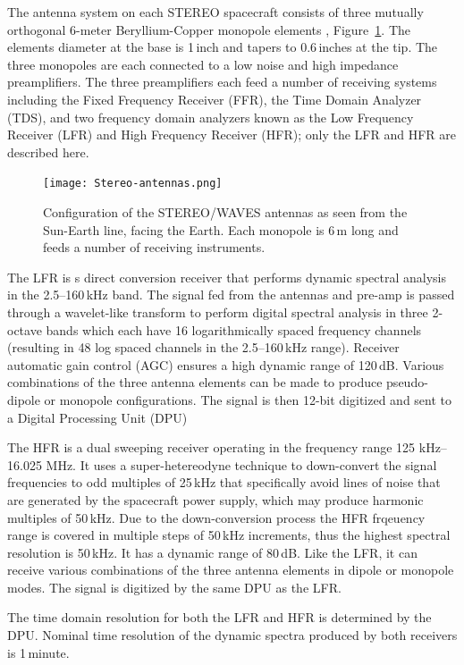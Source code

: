 The antenna system on each STEREO spacecraft consists of three mutually orthogonal 6-meter Beryllium-Copper monopole elements \citep{bale2008}, Figure~\ref{fig:swaves_antennas}. The elements diameter at the base is 1\,inch and tapers to 0.6\,inches at the tip. The three monopoles are each connected to a low noise and high impedance preamplifiers. The three preamplifiers each feed a number of receiving systems including the Fixed Frequency Receiver (FFR), the Time Domain Analyzer (TDS), and two frequency domain analyzers known as the Low Frequency Receiver (LFR) and High Frequency Receiver (HFR); only the LFR and HFR are described here.
\begin{figure}[!t]
\begin{center}
\texttt{[image: Stereo-antennas.png]}
\caption[The SWAVES antennas]{Configuration of the STEREO/WAVES antennas as seen from the Sun-Earth line, facing the Earth. Each monopole is 6\,m long and feeds a number of receiving instruments.}
\label{fig:swaves_antennas}
\end{center}
\end{figure}

The LFR is s direct conversion receiver that performs dynamic spectral analysis in the 2.5--160\,kHz band. The signal fed from the antennas and pre-amp is passed through a wavelet-like transform to perform digital spectral analysis in three 2-octave bands which each have 16 logarithmically spaced frequency channels (resulting in 48 log spaced channels in the 2.5--160\,kHz range). Receiver automatic gain control (AGC) ensures a high dynamic range of 120\,dB. Various combinations of the three antenna elements can be made to produce pseudo-dipole or monopole configurations. The signal is then 12-bit digitized and sent to a Digital Processing Unit (DPU)

The HFR is a dual sweeping receiver operating in the frequency range 125 kHz--16.025 MHz. It uses a super-hetereodyne technique to down-convert the signal frequencies to odd multiples of 25\,kHz that specifically avoid lines of noise that are generated by the spacecraft power supply, which may produce harmonic multiples of 50\,kHz. Due to the down-conversion process the HFR frqeuency range is covered in multiple steps of 50\,kHz increments, thus the highest spectral resolution is 50\,kHz. It has a dynamic range of 80\,dB. Like the LFR, it can receive various combinations of the three antenna elements in dipole or monopole modes. The signal is digitized by the same DPU as the LFR.

The time domain resolution for both the LFR and HFR is determined by the DPU. Nominal time resolution of the dynamic spectra produced by both receivers is 1\,minute.


